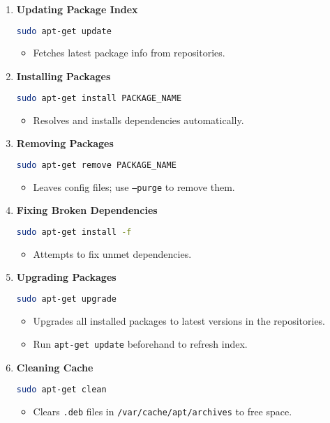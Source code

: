 \documentclass[12pt,a4paper]{report}
\begin{document}
\begin{enumerate}
    \item \textbf{Updating Package Index}
    \begin{lstlisting}[language=bash]
sudo apt-get update
    \end{lstlisting}
    \begin{itemize}
        \item Fetches latest package info from repositories.
    \end{itemize}

    \item \textbf{Installing Packages}
    \begin{lstlisting}[language=bash]
sudo apt-get install PACKAGE_NAME
    \end{lstlisting}
    \begin{itemize}
        \item Resolves and installs dependencies automatically.
    \end{itemize}

    \item \textbf{Removing Packages}
    \begin{lstlisting}[language=bash]
sudo apt-get remove PACKAGE_NAME
    \end{lstlisting}
    \begin{itemize}
        \item Leaves config files; use \texttt{--purge} to remove them.
    \end{itemize}

    \item \textbf{Fixing Broken Dependencies}
    \begin{lstlisting}[language=bash]
sudo apt-get install -f
    \end{lstlisting}
    \begin{itemize}
        \item Attempts to fix unmet dependencies.
    \end{itemize}

    \item \textbf{Upgrading Packages}
    \begin{lstlisting}[language=bash]
sudo apt-get upgrade
    \end{lstlisting}
    \begin{itemize}
        \item Upgrades all installed packages to latest versions in the repositories.
        \item Run \texttt{apt-get update} beforehand to refresh index.
    \end{itemize}

    \item \textbf{Cleaning Cache}
    \begin{lstlisting}[language=bash]
sudo apt-get clean
    \end{lstlisting}
    \begin{itemize}
        \item Clears \texttt{.deb} files in \texttt{/var/cache/apt/archives} to free space.
    \end{itemize}
\end{enumerate}
\end{document}

